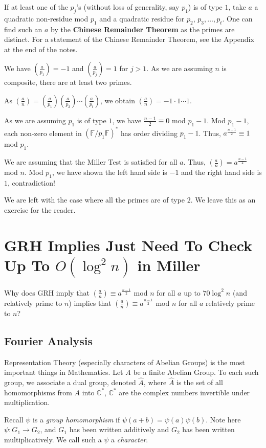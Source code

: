 \documentclass[12pt,letterpaper]{report}
\newcommand{\C}{\ensuremath{\mathbb{C}}}
\newcommand{\F}{\mathbb{F}}
\newcommand\lag[2]{\ensuremath{\left(\frac{#1}{#2}\right)}}
\begin{document}
If at least one of the $p_j$'s (without loss of generality, say
$p_1$) is of type $1$, take $a$ a quadratic non-residue mod $p_1$
and a quadratic residue for $p_2$, $p_3, \dots, p_t$. One can find
such an $a$ by the \textbf{Chinese Remainder Theorem} as the
primes are distinct. For a statement of the Chinese Remainder
Theorem, see the Appendix at the end of the notes.

We have $\lag{a}{p_1} = -1$ and $\lag{a}{p_j} = 1$ for $j > 1$. As
we are assuming $n$ is composite, there are at least two primes.

As $\lag{a}{n} = \lag{a}{p_1} \lag{a}{p_2} \cdots \lag{a}{p_t}$,
we obtain $\lag{a}{n} = -1 \cdot 1 \cdots 1$.

As we are assuming $p_1$ is of type $1$, we have $\frac{n-1}{2}
\equiv 0$ mod $p_1 - 1$. Mod $p_1 - 1$, each non-zero element in
$(\F/p_1\F)^{*}$ has order dividing $p_1 - 1$. Thus,
$a^{\frac{n-1}{2}} \equiv 1$ mod $p_1$.

We are assuming that the Miller Test is satisfied for all $a$.
Thus, $\lag{a}{n} = a^{\frac{n-1}{2}}$ mod $n$. Mod $p_1$, we have
shown the left hand side is $-1$ and the right hand side is $1$,
contradiction!

We are left with the case where all the primes are of type $2$. We
leave this as an exercise for the reader.

\section{GRH Implies Just Need To Check Up To $O(\log^2 n)$ in
Miller}

Why does GRH imply that $\lag{a}{n} \equiv a^{\frac{n-1}{2}}$ mod
$n$ for all $a$ up to $70\log^2 n$ (and relatively prime to $n$)
implies that $\lag{a}{n} \equiv a^{\frac{n-1}{2}}$ mod $n$ for all
$a$ relatively prime to $n$?

\subsection{Fourier Analysis}

Representation Theory (especially characters of Abelian Groups) is
the most important things in Mathematics. Let $A$ be a finite
Abelian Group. To each such group, we associate a dual group,
denoted $\hat{A}$, where $\hat{A}$ is the set of all homomorphisms
from $A$ into $\C^{*}$, $\C^{*}$ are the complex numbers
invertible under multiplication.

Recall $\psi$ is a \emph{group homomorphism} if $\psi(a+b) =
\psi(a)\psi(b)$. Note here $\psi:G_1 \rightarrow G_2$, and $G_1$
has been written additively and $G_2$ has been written
multiplicatively. We call such a $\psi$ a \emph{character}.
\end{document}
